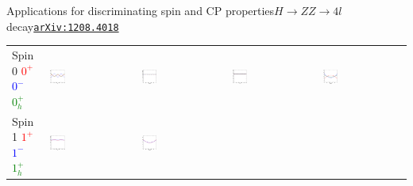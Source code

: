 \documentclass[usenames,dvipsnames,svgnames,table]{beamer}
\newcommand{\arxiv}[1]{\href{http://arxiv.org/abs/#1}{\nolinkurl{arXiv:#1}}}
\begin{document}
\begin{frame}{Applications for discriminating spin and CP properties}{$H\to ZZ\to 4l$ decay\hfill \arxiv{1208.4018}}
\begin{tabular}{m{}m{}m{}m{}m{}}
\footnotesize\centering Spin 0 \tiny \textcolor{red}{$0^+$} \textcolor{blue}{$0^-$} \textcolor{Green}{$0_h^+$} &
\noindent\includegraphics[width=0.18\textwidth]{onthespinandparity/phi_125GeV_spin0} &
\noindent\includegraphics[width=0.18\textwidth]{onthespinandparity/costhetastar_125GeV_spin0} &
\noindent\includegraphics[width=0.18\textwidth]{onthespinandparity/phistar1_125GeV_spin0} &
\noindent\includegraphics[width=0.18\textwidth]{onthespinandparity/costheta1_125GeV_spin0} \\
\footnotesize\centering Spin 1 \tiny \textcolor{red}{$1^+$} \textcolor{blue}{$1^-$} \textcolor{Green}{$1_h^+$} &
\noindent\includegraphics[width=0.18\textwidth]{onthespinandparity/phi_125GeV_spin1} &
\noindent\includegraphics[width=0.18\textwidth]{onthespinandparity/costhetastar_125GeV_spin1} &

\end{tabular}
\end{frame}
\end{document}
